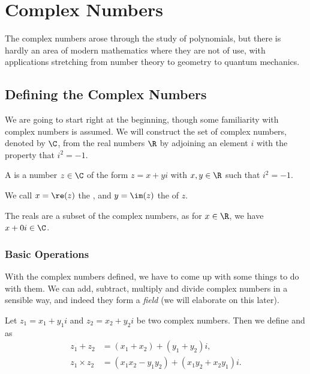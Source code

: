 
\chapter{Complex Numbers}

The complex numbers arose through the study of polynomials, but there is hardly an area of modern mathematics where they are not of use, with applications stretching from number theory to geometry to quantum mechanics.


\section{Defining the Complex Numbers}

We are going to start right at the beginning, though some familiarity with complex numbers is assumed.
We will construct the set of complex numbers, denoted by $\C$, from the real numbers $\R$ by adjoining an element $i$ with the property that $i^2 = -1$.

\begin{definition}
	A  is a number $z \in \C$ of the form $z = x + yi$ with $x, y \in \R$ such that $i^2 = -1$. 
	
	We call $x = \re(z)$ the , and $y = \im(z)$ the  of $z$.
\end{definition}

The reals are a subset of the complex numbers, as for $x \in \R$, we have $x + 0i \in \C$. 

\subsection{Basic Operations}

With the complex numbers defined, we have to come up with some things to do with them.
We can add, subtract, multiply and divide complex numbers in a sensible way, and indeed they form a \emph{field} (we will elaborate on this later).

\begin{definition}
	Let $z_1 = x_1 + y_1 i$ and $z_2 = x_2 + y_2 i$ be two complex numbers. Then we define  and  as
	\begin{align*}
		z_1 + z_2 &= (x_1 + x_2) + (y_1 + y_2)i,\\
		z_1 \times z_2 &= (x_1 x_2 - y_1 y_2) + (x_1 y_2 + x_2 y_1)i.
	\end{align*}
\end{definition}

